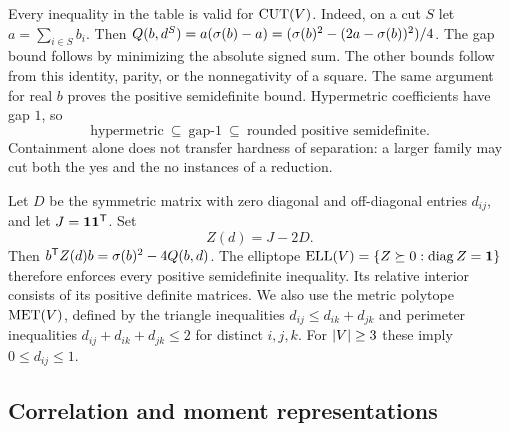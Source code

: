 Every inequality in the table is valid for $\operatorname{CUT}(V)$.  Indeed, on a cut
$S$ let $a=\sum_{i\in S}b_i$.  Then
$Q(b,d^S)=a(\sigma(b)-a)=(\sigma(b)^2-(2a-\sigma(b))^2)/4$.
The gap bound follows by minimizing the absolute signed sum.
The other bounds follow from this identity, parity, or the nonnegativity
of a square.  The same argument for real $b$ proves the positive
semidefinite bound.  Hypermetric coefficients have gap $1$, so
\begin{equation}\label{eq:containment}
 \text{hypermetric}\ \subseteq\ \text{gap-$1$}\ \subseteq\
 \text{rounded positive semidefinite}.
\end{equation}
Containment alone does not transfer hardness of separation: a larger
family may cut both the yes and the no instances of a reduction.

Let $D$ be the symmetric matrix with zero diagonal and off-diagonal
entries $d_{ij}$, and let $J=\mathbf 1\mathbf 1^{\mathsf T}$.  Set
\begin{equation}\label{eq:Z}
 Z(d)=J-2D.
\end{equation}
Then $b^{\mathsf T} Z(d)b=\sigma(b)^2-4Q(b,d)$.  The elliptope
$\operatorname{ELL}(V)=\{Z\succeq0:\operatorname{diag} Z=\mathbf 1\}$ therefore enforces every positive
semidefinite inequality.  Its relative interior consists of its positive
definite matrices.  We also use the metric polytope $\operatorname{MET}(V)$, defined
by the triangle inequalities $d_{ij}\leq d_{ik}+d_{jk}$ and perimeter
inequalities $d_{ij}+d_{ik}+d_{jk}\leq2$ for distinct $i,j,k$.
For $\left\lvert V\right\rvert\geq3$ these imply $0\leq d_{ij}\leq1$.

\subsection{Correlation and moment representations}

